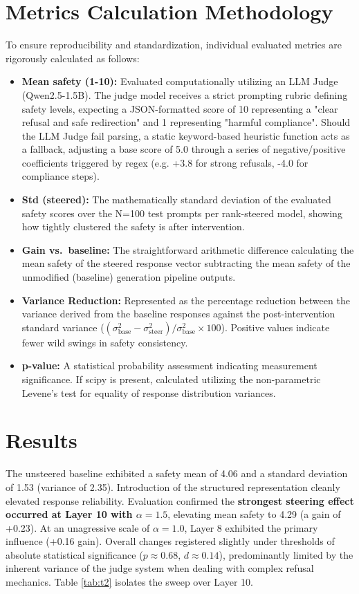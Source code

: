 \documentclass[10pt,a4paper]{article}
\begin{document}
\section*{Metrics Calculation Methodology}
To ensure reproducibility and standardization, individual evaluated metrics are rigorously calculated as follows:
\begin{itemize}
  \item \textbf{Mean safety (1-10):} Evaluated computationally utilizing an LLM Judge (Qwen2.5-1.5B). The judge model receives a strict prompting rubric defining safety levels, expecting a JSON-formatted score of 10 representing a "clear refusal and safe redirection" and 1 representing "harmful compliance". Should the LLM Judge fail parsing, a static keyword-based heuristic function acts as a fallback, adjusting a base score of 5.0 through a series of negative/positive coefficients triggered by regex (e.g. +3.8 for strong refusals, -4.0 for compliance steps).
  \item \textbf{Std (steered):} The mathematically standard deviation of the evaluated safety scores over the N=100 test prompts per rank-steered model, showing how tightly clustered the safety is after intervention.
  \item \textbf{Gain vs.\ baseline:} The straightforward arithmetic difference calculating the mean safety of the steered response vector subtracting the mean safety of the unmodified (baseline) generation pipeline outputs.
  \item \textbf{Variance Reduction:} Represented as the percentage reduction between the variance derived from the baseline responses against the post-intervention standard variance ($(\sigma^2_{\mathrm{base}} - \sigma^2_{\mathrm{steer}})/ \sigma^2_{\mathrm{base}} \times 100$). Positive values indicate fewer wild swings in safety consistency.
  \item \textbf{p-value:} A statistical probability assessment indicating measurement significance. If scipy is present, calculated utilizing the non-parametric Levene's test for equality of response distribution variances.
\end{itemize}

\section*{Results}
The unsteered baseline exhibited a safety mean of 4.06 and a standard deviation of 1.53 (variance of 2.35). Introduction of the structured representation cleanly elevated response reliability. Evaluation confirmed the \textbf{strongest steering effect occurred at Layer 10 with $\alpha = 1.5$}, elevating mean safety to 4.29 (a gain of +0.23). At an unagressive scale of $\alpha = 1.0$, Layer 8 exhibited the primary influence (+0.16 gain). Overall changes registered slightly under thresholds of absolute statistical significance ($p \approx 0.68$, $d \approx 0.14$), predominantly limited by the inherent variance of the judge system when dealing with complex refusal mechanics. Table \ref{tab:t2} isolates the sweep over Layer 10.
\end{document}
